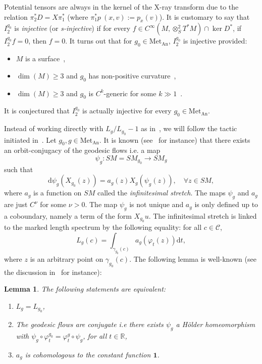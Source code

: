 \documentclass[10pt]{amsart}
\newtheorem{lemm}[theo]{Lemma}\newtheorem{prop}[theo]{Proposition}\newtheorem{coro}[theo]{Corollary}\newtheorem{conj}[theo]{Conjecture}
\theoremstyle{definition}\newtheorem{defi}[theo]{Definition}\newtheorem{rema}[theo]{Remark}\newtheorem{exam}[theo]{Example}\newtheorem{exem}[theo]{Example}\newtheorem{nota}[theo]{Notation}
\newcommand{\R}{\mathbb{R}}
\newcommand{\bfun}{\mathbf{1}}
\newcommand{\mc}{\mathcal}
\newcommand{\dd}{\mathrm{d}}
\newcommand{\Met}{\mathrm{Met}}
\newcommand{\An}{\mathrm{An}}
\let\oldforall\forall
\renewcommand*{\forall}{\mathrel{\oldforall}}
\begin{document}
Potential tensors are always in the kernel of the X-ray transform due to the relation $\pi_2^*D = X \pi_1^*$ (where $\pi_1^* p~(x,v) := p_x(v)$). It is customary to say that $I^{g_0}_2$ is \emph{injective} (or \emph{s-injective}) if for every $f\in C^\infty(M, \otimes^2_S T^\ast M) \cap \ker D^*$, if $I^{g_0}_2 f = 0$, then $f=0$. It turns out that for $g_0\in \Met_{\An}$, $I^{g_0}_2$ is injective provided:
\begin{itemize}
\item $M$ is a surface~\cite{Paternain-Salo-Uhlmann-14-1,Guillarmou-17-1},
\item $\dim(M)\geq 3$ and $g_0$ has non-positive curvature~\cite{Croke-Sharafutdinov-98},
\item $\dim(M)\geq 3$ and $g_0$ is $C^k$-generic for some $k\gg1$~\cite{Cekic-Lefeuvre-21}.
\end{itemize}
It is conjectured that $I^{g_0}_2$ is actually injective for every $g_0 \in \Met_{\An}$.

Instead of working directly with $L_g/L_{g_0}-1$ as in~\cite{Guillarmou-Lefeuvre-18}, we will follow the tactic initiated in~\cite{Guillarmou-Knieper-Lefeuvre-19}. Let $g_0, g\in \Met_{\An}$. It is known (see~\cite[Appendix~B]{Guillarmou-Knieper-Lefeuvre-19} for instance) that there exists an orbit-conjugacy of the geodesic flows i.e. a map
\[
\psi_g : SM=SM_{g_0} \rightarrow SM_g
\]
such that
\[
\dd \psi_{g}(X_{g_0}(z)) = a_g(z) X_g(\psi_g(z)),\quad\forall z \in SM,
\]
where $a_g$ is a function on $SM$ called the \emph{infinitesimal stretch}. The maps $\psi_g$ and $a_g$ are just $C^\nu$ for some $\nu > 0$. The map $\psi_g$ is not unique and $a_g$ is only defined up to a coboundary, namely a term of the form $X_{g_0} u$. The infinitesimal stretch is linked to the marked length spectrum by the following equality: for all $c \in \mc{C}$,
\[
L_g(c) = \int_{\gamma_{g_0}(c)} a_g(\varphi_t(z)) \dd t,
\]
where $z$ is an arbitrary point on $\gamma_{g_0}(c)$. The following lemma is well-known (see the discussion in~\cite[Section~2.5]{Guillarmou-Knieper-Lefeuvre-19} for instance):

\begin{lemm}
The following statements are equivalent:
\begin{enumerate}
\item $L_g = L_{g_0}$,
\item The geodesic flows are conjugate i.e there exists $\psi_g$ a H\"older homeomorphism with $\psi_g \circ \varphi_t^{g_0} = \varphi_t^g \circ \psi_g$, for all $t \in \R$,
\item $a_g$ is cohomologous to the constant function $\bfun$.
\end{enumerate}
\end{lemm}
\end{document}
